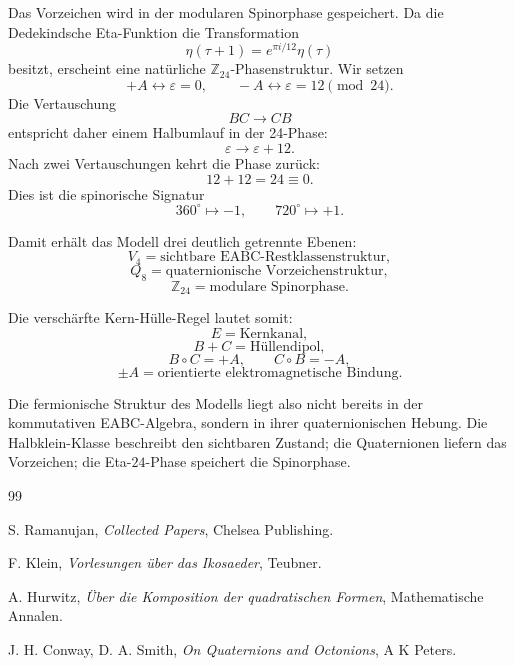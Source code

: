 \documentclass[11pt,a4paper]{article}
\begin{document}
	Das Vorzeichen wird in der modularen Spinorphase gespeichert. Da die
	Dedekindsche Eta-Funktion die Transformation
	\[
	\eta(\tau+1)=e^{\pi i/12}\eta(\tau)
	\]
	besitzt, erscheint eine natürliche \(\mathbb Z_{24}\)-Phasenstruktur.
	Wir setzen
	\[
	+A\leftrightarrow \varepsilon=0,
	\qquad
	-A\leftrightarrow \varepsilon=12
	\pmod{24}.
	\]
	Die Vertauschung
	\[
	BC\longrightarrow CB
	\]
	entspricht daher einem Halbumlauf in der 24-Phase:
	\[
	\varepsilon\longrightarrow \varepsilon+12.
	\]
	Nach zwei Vertauschungen kehrt die Phase zurück:
	\[
	12+12=24\equiv0.
	\]
	Dies ist die spinorische Signatur
	\[
	360^\circ\mapsto -1,
	\qquad
	720^\circ\mapsto +1.
	\]
	
	Damit erhält das Modell drei deutlich getrennte Ebenen:
	\[
	V_4=\text{sichtbare EABC-Restklassenstruktur},
	\]
	\[
	Q_8=\text{quaternionische Vorzeichenstruktur},
	\]
	\[
	\mathbb Z_{24}=\text{modulare Spinorphase}.
	\]
	
	Die verschärfte Kern-Hülle-Regel lautet somit:
	\[
	\boxed{
		E=\text{Kernkanal},
	}
	\]
	\[
	\boxed{
		B+C=\text{Hüllendipol},
	}
	\]
	\[
	\boxed{
		B\circ C=+A,\qquad C\circ B=-A,
	}
	\]
	\[
	\boxed{
		\pm A=\text{orientierte elektromagnetische Bindung}.
	}
	\]
	
	Die fermionische Struktur des Modells liegt also nicht bereits in der
	kommutativen EABC-Algebra, sondern in ihrer quaternionischen Hebung. Die
	Halbklein-Klasse beschreibt den sichtbaren Zustand; die Quaternionen liefern
	das Vorzeichen; die Eta-\(24\)-Phase speichert die Spinorphase.
	
	\begin{thebibliography}{99}
		
		S. Ramanujan,
		\emph{Collected Papers},
		Chelsea Publishing.
		
		F. Klein,
		\emph{Vorlesungen über das Ikosaeder},
		Teubner.
		
		A. Hurwitz,
		\emph{Über die Komposition der quadratischen Formen},
		Mathematische Annalen.
		
		J. H. Conway, D. A. Smith,
		\emph{On Quaternions and Octonions},
		A K Peters.
		
	\end{thebibliography}
	
\end{document}
